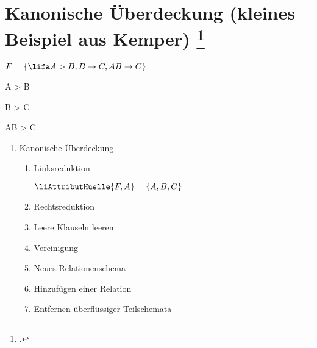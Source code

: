 \documentclass{lehramt-informatik-aufgabe}
\begin{document}

\section{Kanonische Überdeckung (kleines Beispiel aus Kemper)
\footcite[Seite 186]{kemper}
}

$F = \{\lifa A > B, B \rightarrow C, AB \rightarrow C\}$

\begin{compactitem}
\item \lifa A > B
\item \lifa B > C
\item \lifa  AB > C
\end{compactitem}

\begin{enumerate}
\item Kanonische Überdeckung

\begin{enumerate}
\item Linksreduktion

$\liAttributHuelle{F, A} = \{A, B, C\}$


\item Rechtsreduktion


\item Leere Klauseln leeren


\item Vereinigung

\item Neues Relationenschema


\item Hinzufügen einer Relation
\item Entfernen überflüssiger Teilschemata

\end{enumerate}
\end{enumerate}
\end{document}
